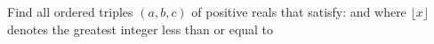 Find all ordered triples $(a,b,c)$ of positive reals that satisfy:  and  where $\lfloor x\rfloor$ denotes the greatest integer less than or equal to 